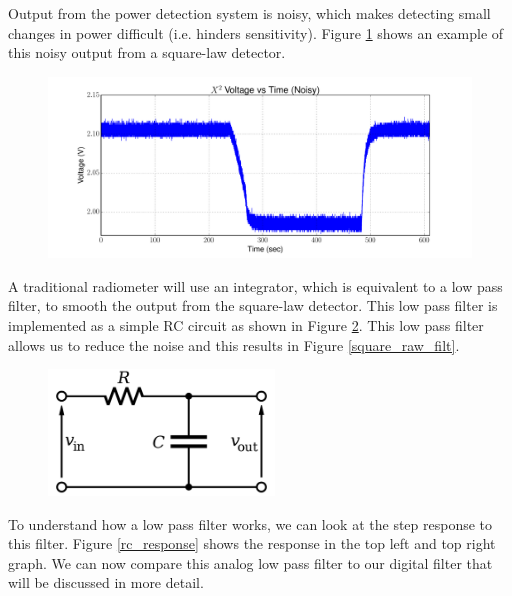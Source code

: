 Output from the power detection system is noisy, which makes detecting small changes in power difficult (i.e. hinders sensitivity).  Figure \ref{square_raw} shows an example of this noisy output from a square-law detector.

{\begin{figure}[h!tb] 
\centering
\includegraphics[width=17cm]{Experiments/Exp1/noisy_voltage.pdf}
\label{square_raw}
\end{figure}
}

A traditional radiometer will use an integrator, which is equivalent to a low pass filter, to smooth the output from the square-law detector.  This low pass filter is implemented as a simple RC circuit as shown in Figure \ref{rc_circuit}.  This low pass filter allows us to reduce the noise and this results in Figure \ref{square_raw_filt}.  

{\begin{figure}[h!tb] 
\centering
\includegraphics[width=6cm]{Images/rc_lpf.png}
\label{rc_circuit}
\end{figure}
}

To understand how a low pass filter works, we can look at the step response to this filter.  Figure \ref{rc_response} shows the response in the top left and top right graph.  We can now compare this analog low pass filter to our digital filter that will be discussed in more detail.  

